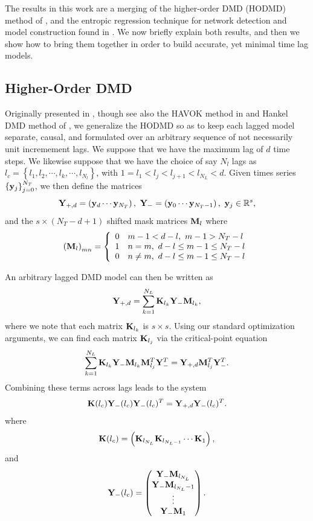 \documentclass[a4paper,11pt]{article}
\newcommand{\ba}{\begin{array}}
\newcommand{\ea}{\end{array}}
\begin{document}
The results in this work are a merging of the higher-order DMD (HODMD) method of \cite{clainche}, and the entropic regression technique for network detection and model construction found in \cite{bollt, bollt2}.  We now briefly explain both results, and then we show how to bring them together in order to build accurate, yet minimal time lag models.     

\subsection{Higher-Order DMD}

Originally presented in \cite{clainche}, though see also the HAVOK method in \cite{brunton_havok} and Hankel DMD method of \cite{arbabi}, we generalize the HODMD so as to keep each lagged model separate, causal, and formulated over an arbitrary sequence of not necessarily unit incremement lags.  We suppose that we have the maximum lag of $d$ time steps.  We likewise suppose that we have the choice of say $N_{l}$ lags as $l_{c}=\left\{l_{1}, l_{2}, \cdots, l_{k}, \cdots, l_{N_{l}}\right\}$, with $1=l_{1} < l_{j} < l_{j+1} < l_{N_{L}}<d$.  Given times series $\left\{{\bf y}_{j}\right\}_{j=0}^{N_{T}}$, we then define the matrices 
\[
{\bf Y}_{+,d} = \left({\bf y}_{d} \cdots {\bf y}_{N_{T}}\right), ~ {\bf Y}_{-} = \left({\bf y}_{0} \cdots {\bf y}_{N_{T}-1}\right), ~ {\bf y}_{j}\in\mathbb{R}^{s},
\]  
and the $s\times (N_{T}-d+1)$ shifted mask matrices ${\bf M}_{l}$ where
\[
\left({\bf M}_{l}\right)_{mn} = \left\{
\ba{rl}
0 & m-1 < d-l, ~ m-1 > N_{T} - l\\
1 & n=m, ~ d-l\leq m-1 \leq N_{T} - l\\
0 & n\neq m, ~ d-l\leq m-1 \leq N_{T} - l
\ea
\right.
\]

An arbitrary lagged DMD model can then be written as 
\begin{equation}
{\bf Y}_{+,d} = \sum_{k=1}^{N_{L}}{\bf K}_{l_{k}}{\bf Y}_{-}{\bf M}_{l_{k}},
\label{basic_model}
\end{equation}
where we note that each matrix ${\bf K}_{l_{k}}$ is $s\times s$.  Using our standard optimization arguments, we can find each matrix ${\bf K}_{l_{j}}$ via the critical-point equation
\[
\sum_{k=1}^{N_{L}}{\bf K}_{l_{k}}{\bf Y}_{-}{\bf M}_{l_{k}}{\bf M}_{l_{j}}^{T}{\bf Y}_{-}^{T} = {\bf Y}_{+,d}{\bf M}_{l_{j}}^{T}{\bf Y}_{-}^{T}.
\]
Combining these terms across lags leads to the system 
\[
{\bf K}(l_{c}) {\bf Y}_{-}(l_{c}){\bf Y}_{-}(l_{c})^{T} = {\bf Y}_{+, d}{\bf Y}_{-}(l_{c})^{T}.
\]
where
\[
{\bf K}(l_{c}) = \left({\bf K}_{l_{N_{L}}} {\bf K}_{l_{N_{L}-1}} \cdots {\bf K}_{1}\right), 
\]
and
\[
{\bf Y}_{-}(l_{c}) = \begin{pmatrix} {\bf Y}_{-}{\bf M}_{l_{N_{L}}} \\ {\bf Y}_{-}{\bf M}_{l_{N_{L}}-1} \\ \vdots \\ {\bf Y}_{-}{\bf M}_{1} \end{pmatrix}.
\]
\end{document}
